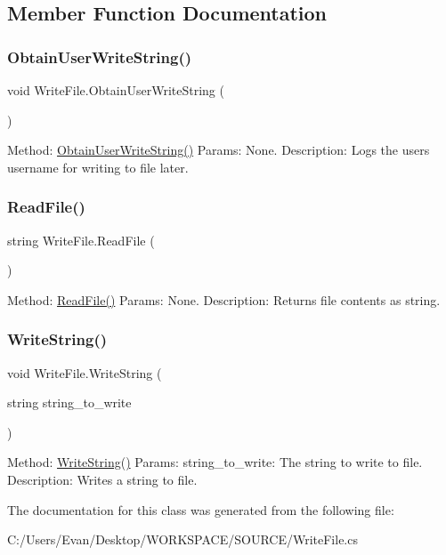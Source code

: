 \subsection{Member Function Documentation}
\mbox{\label{class_write_file_aba1eb90785d49a55a5d626e38b00d4a4}} 
\subsubsection{\texorpdfstring{ObtainUserWriteString()}{ObtainUserWriteString()}}
{\footnotesize\ttfamily void Write\+File.\+Obtain\+User\+Write\+String (\begin{DoxyParamCaption}{ }\end{DoxyParamCaption})}

Method\+: \mbox{\hyperlink{class_write_file_aba1eb90785d49a55a5d626e38b00d4a4}{Obtain\+User\+Write\+String()}} Params\+: None. Description\+: Logs the user\textquotesingle{}s username for writing to file later. \mbox{\label{class_write_file_a5912677fb1c147fb19a60d41ad438c20}} 
\subsubsection{\texorpdfstring{ReadFile()}{ReadFile()}}
{\footnotesize\ttfamily string Write\+File.\+Read\+File (\begin{DoxyParamCaption}{ }\end{DoxyParamCaption})}

Method\+: \mbox{\hyperlink{class_write_file_a5912677fb1c147fb19a60d41ad438c20}{Read\+File()}} Params\+: None. Description\+: Returns file contents as string. \mbox{\label{class_write_file_a1fefdb84c1e93e6fdeaf8e9a9b82f50e}} 
\subsubsection{\texorpdfstring{WriteString()}{WriteString()}}
{\footnotesize\ttfamily void Write\+File.\+Write\+String (\begin{DoxyParamCaption}\item[{string}]{string\+\_\+to\+\_\+write }\end{DoxyParamCaption})}

Method\+: \mbox{\hyperlink{class_write_file_a1fefdb84c1e93e6fdeaf8e9a9b82f50e}{Write\+String()}} Params\+: string\+\_\+to\+\_\+write\+: The string to write to file. Description\+: Writes a string to file. 

The documentation for this class was generated from the following file\+:\begin{DoxyCompactItemize}
\item 
C\+:/\+Users/\+Evan/\+Desktop/\+W\+O\+R\+K\+S\+P\+A\+C\+E/\+S\+O\+U\+R\+C\+E/Write\+File.\+cs\end{DoxyCompactItemize}
